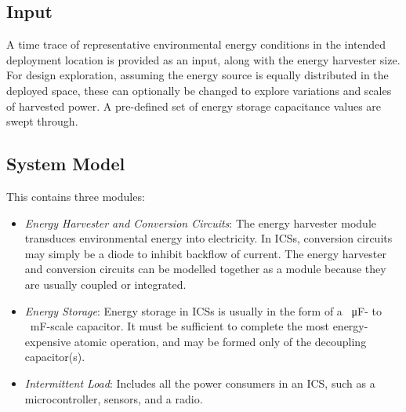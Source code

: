     
\subsection{Input}
A time trace of representative environmental energy conditions in the intended deployment location is provided as an input, along with the energy harvester size. 
For design exploration, assuming the energy source is equally distributed in the deployed space, these can optionally be changed to explore variations and scales of harvested power. 
A pre-defined set of energy storage capacitance values are swept through. 

\subsection{System Model}

This contains three modules:
\begin{itemize}
    \item \textit{Energy Harvester and Conversion Circuits}: The energy harvester module transduces environmental energy into electricity. 
    In ICSs, conversion circuits may simply be a diode to inhibit backflow of current.
    The energy harvester and conversion circuits can be modelled together as a module because they are usually coupled or integrated. 
    \item \textit{Energy Storage}: Energy storage in ICSs is usually in the form of a \SI{}{\micro\farad}-  to \SI{}{\milli\farad}-scale capacitor. It must be sufficient to complete the most energy-expensive atomic operation, and may be formed only of the decoupling capacitor(s). 
    \item \textit{Intermittent Load}: Includes all the power consumers in an ICS, such as a microcontroller, sensors, and a radio. 
\end{itemize}

